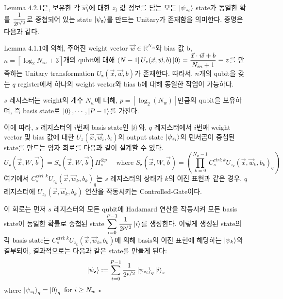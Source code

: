 \begin{lemma}
\end{lemma}

Lemma 4.2.1은, 보유한 각 \(\vec{w}_i\)에 대한 \(\displaystyle {z}_i\) 값 정보를 담는 모든 \(\ket{\psi_{z_i}}\) state가 동일한 확률 \(\displaystyle {1 \over {2^{p/2}}}\)로 중첩되어 있는 state \(\ket{\psi_{\mathbf z}}\)를 만드는 Unitary가 존재함을 의미한다. 증명은 다음과 같다.

\begin{pf}
    Lemma 4.1.1에 의해, 주어진 weight vector $\vec{w} \in \mathbb{R}^{N_{in}}$와 bias 값 b, \(n = \left\lceil \log_2{N_{in}} + 3 \right\rceil\)개의 qubit에 대해 \(\displaystyle \bra{N-1}U_z(\vec{x},\vec{w},b)\ket{0} = \frac{\vec{x}\cdot \vec{w}+b}{N_{in}+1} \equiv z\)를 만족하는 Unitary transformation \(U_{\mathbf z}(\vec{x},\vec{w},b)\)가 존재한다. 따라서, $n$개의 qubit을 갖는 $q$ register에서 하나의 weight vector와 bias b에 대해 동일한 작업이 가능하다.

    $s$ 레지스터는 weight의 개수 \(N_w\)에 대해, \(p = \left\lceil \log_2(N_w) \right\rceil\)만큼의 qubit을 보유하며, 즉 basis state로 \(\ket{0}, \cdots, \ket{P-1}\)를 가진다.

    이에 따라, \(s\) 레지스터의 \(i\)번째 basis state인 \(\ket{i}\)와, \(q\) 레지스터에서 \(i\)번째 weight vector 및 bias 값에 대한 \(U_z(\vec{x}, \vec{w}_i, b_i)\)의 output state \(\ket{\psi_{z_i}}\)의 텐서곱이 중첩된 state를 만드는 양자 회로를 다음과 같이 설계할 수 있다.
    \[
        U_{\mathbf z}(\vec{x}, W, \vec{b}) = S_{\mathbf z}(\vec{x}, W, \vec{b}) H_s^{\otimes p} \quad \text{ where } S_{\mathbf z}(\vec{x}, W, \vec{b})= \left(\prod_{k=0}^{N_w-1}C_{s}^{ctrl : k}U_{z_k}(\vec{x}, \vec{w}_k, b_k)_q\right)
    \]
    여기에서 \(C_{s}^{ctrl:k}U_{z_k}(\vec{x}, \vec{w}_k, b_k)_q\)는 \(s\) 레지스터의 상태가 \(k\)의 이진 표현과 같은 경우, \(q\) 레지스터에 \(U_{z_k}(\vec{x}, \vec{w}_k, b_k)\) 연산을 작동시키는 Controlled-Gate이다.

    이 회로는 먼저 \(s\) 레지스터의 모든 qubit에 Hadamard 연산을 작동시켜 모든 basis state이 동일한 확률로 중첩된 state \(\displaystyle \sum_{i=0}^{P-1} {1\over {2^{p/2}}}\ket{i}\)를 생성한다. 이렇게 생성된 state의 각 basis state는 \(C_{s}^{ctrl:k}U_{z_k}(\vec{x}, \vec{w}_k, b_k)\)에 의해 basis의 이진 표현에 해당하는 $\ket{\psi_k}$와 결부되어, 결과적으로는 다음과 같은 state를 만들게 된다:
    \[
        \ket{\psi_{\mathbf{z}}} := \sum_{i=0}^{P-1} {1\over {2^{p/2}}} \ket{\psi_{z_i}}_q \ket{i}_s
    \]
    where \(\ket{\psi_{z_i}}_q = \ket{0}_q \text{ for } i \ge N_w\) \quad $\square$
\end{pf}


